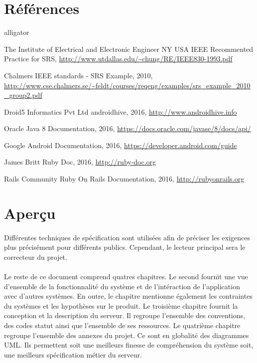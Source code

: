 \documentclass[titlepage, 12pt]{report}
\begin{document}
\section{Références}
\begin{labeling}{alligator}
	\item [The Institute of Electrical and Electronic Engineer NY USA] IEEE Recommented Practice for SRS, \url{http://www.utdallas.edu/~chung/RE/IEEE830-1993.pdf}
	\item [Chalmers] IEEE standards - SRS Example, 2010, \url{http://www.cse.chalmers.se/~feldt/courses/reqeng/examples/srs_example_2010_group2.pdf}
	\item [Droid5 Informatics Pvt Ltd] androidhive, 2016, \url{http://www.androidhive.info}
	\item [Oracle] Java 8 Documentation, 2016, \url{https://docs.oracle.com/javase/8/docs/api/}
	\item [Google] Android Documentation, 2016, \url{https://developer.android.com/guide}
	\item [James Britt] Ruby Doc, 2016, \url{http://ruby-doc.org}
	\item [Rails Community] Ruby On Rails Documentation, 2016, \url{http://rubyonrails.org}
\end{labeling}

\section{Aperçu}

\paragraph{}Différentes techniques de spécification sont utilisées afin de préciser les exigences plus précisément pour différents publics. Cependant, le lecteur principal sera le correcteur du projet.

\paragraph{}Le reste de ce document comprend quatres chapitres. Le second fournit une vue d'ensemble de la fonctionnalité du système et de l'intéraction de l'application avec d'autres systèmes. En outre, le chapitre mentionne également les contraintes du systèmes et les hypothèses sur le produit.
Le troisième chapitre fournit la conception et la description du serveur. Il regroupe l'ensemble des conventions, des codes statut ainsi que l'ensemble de ses ressources.
Le quatrième chapitre regroupe l'ensemble des annexes du projet. Ce sont en globalité des diagrammes UML. Ils permettent soit une meilleurs finesse de compréhension du système soit, une meilleurs spécification métier du serveur.
\end{document}
